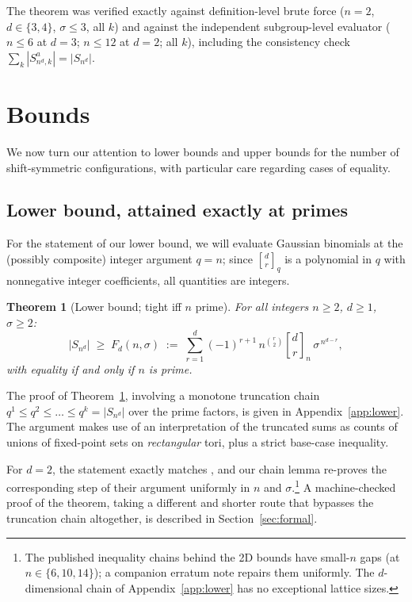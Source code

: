 \documentclass[11pt,a4paper]{article}
\newtheorem{theorem}{Theorem}[section]
\theoremstyle{remark}
\newcommand{\gaussbinom}[2]{\genfrac{[}{]}{0pt}{}{#1}{#2}}
\begin{document}
The theorem was verified exactly against definition-level brute force
($n=2$, $d\in\{3,4\}$, $\sigma\le3$, all $k$) and against the independent
subgroup-level evaluator ($n\le6$ at $d=3$; $n\le12$ at $d=2$; all $k$),
including the consistency check $\sum_k|S^a_{n^d,k}|=|S_{n^d}|$.

\section{Bounds}\label{sec:bounds}

We now turn our attention to lower bounds and upper bounds for the number of shift-symmetric configurations, with particular care regarding cases of equality.

\subsection{Lower bound, attained exactly at primes}

For the statement of our lower bound, we will evaluate Gaussian binomials at the (possibly
composite) integer argument $q=n$; since $\gaussbinom dr_q$ is a polynomial
in $q$ with nonnegative integer coefficients, all quantities are integers.

\begin{theorem}[Lower bound; tight iff $n$ prime]\label{thm:lower-bound}
For all integers $n\ge2$, $d\ge1$, $\sigma\ge2$:
\[
    |S_{n^d}| \;\ge\; F_d(n,\sigma)\;:=\;
    \sum_{r=1}^{d}(-1)^{r+1}\,n^{\binom r2}\gaussbinom dr_n\,
    \sigma^{\,n^{d-r}},
\]
with equality if and only if $n$ is prime.
\end{theorem}

The proof of Theorem~\ref{thm:lower-bound}, involving a monotone truncation chain $q^1\le q^2\le\dots\le
q^k=|S_{n^d}|$ over the prime factors, is given in
Appendix~\ref{app:lower}. The argument makes use of an interpretation of the
truncated sums as counts of unions of fixed-point sets on
\emph{rectangular} tori, plus a strict base-case inequality.

For $d=2$, the statement exactly matches
\cite[Lemma~E.21]{banda2019}, and our chain lemma re-proves the
corresponding step of their argument uniformly in $n$ and
$\sigma$.\footnote{The published inequality chains behind the 2D bounds
have small-$n$ gaps (at $n\in\{6,10,14\}$); a companion erratum note
repairs them uniformly. The $d$-dimensional chain of
Appendix~\ref{app:lower} has no exceptional lattice sizes.} A
machine-checked proof of the theorem, taking a different and shorter
route that bypasses the truncation chain altogether, is described in
Section~\ref{sec:formal}.
\end{document}
